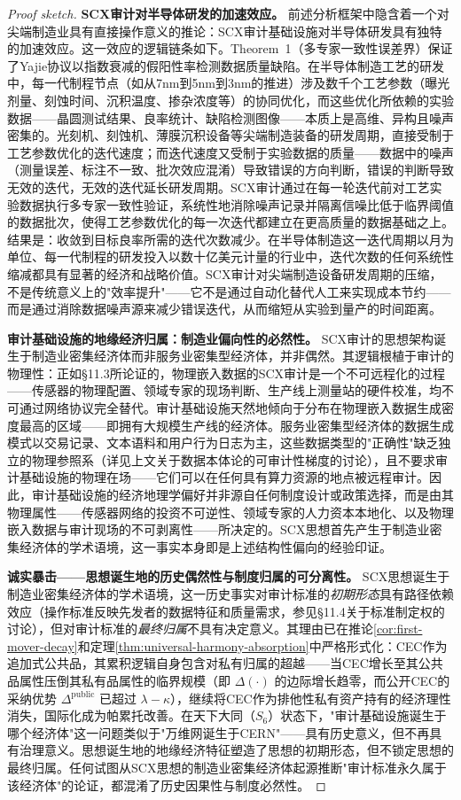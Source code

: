 \documentclass[12pt,a4paper]{ctexart}
\theoremstyle{definition}
\theoremstyle{remark}
\begin{document}
\begin{proof}[Proof sketch]
\textbf{SCX审计对半导体研发的加速效应。} 前述分析框架中隐含着一个对尖端制造业具有直接操作意义的推论：SCX审计基础设施对半导体研发具有独特的加速效应。这一效应的逻辑链条如下。Theorem~1（多专家一致性误差界）保证了Yajie协议以指数衰减的假阳性率检测数据质量缺陷。在半导体制造工艺的研发中，每一代制程节点（如从7nm到5nm到3nm的推进）涉及数千个工艺参数（曝光剂量、刻蚀时间、沉积温度、掺杂浓度等）的协同优化，而这些优化所依赖的实验数据——晶圆测试结果、良率统计、缺陷检测图像——本质上是高维、异构且噪声密集的。光刻机、刻蚀机、薄膜沉积设备等尖端制造装备的研发周期，直接受制于工艺参数优化的迭代速度；而迭代速度又受制于实验数据的质量——数据中的噪声（测量误差、标注不一致、批次效应混淆）导致错误的方向判断，错误的判断导致无效的迭代，无效的迭代延长研发周期。SCX审计通过在每一轮迭代前对工艺实验数据执行多专家一致性验证，系统性地消除噪声记录并隔离信噪比低于临界阈值的数据批次，使得工艺参数优化的每一次迭代都建立在更高质量的数据基础之上。结果是：收敛到目标良率所需的迭代次数减少。在半导体制造这一迭代周期以月为单位、每一代制程的研发投入以数十亿美元计量的行业中，迭代次数的任何系统性缩减都具有显著的经济和战略价值。SCX审计对尖端制造设备研发周期的压缩，不是传统意义上的"效率提升"——它不是通过自动化替代人工来实现成本节约——而是通过消除数据噪声源来减少错误迭代，从而缩短从实验到量产的时间距离。

\textbf{审计基础设施的地缘经济归属：制造业偏向性的必然性。} SCX审计的思想架构诞生于制造业密集经济体而非服务业密集型经济体，并非偶然。其逻辑根植于审计的物理性：正如§11.3所论证的，物理嵌入数据的SCX审计是一个不可远程化的过程——传感器的物理配置、领域专家的现场判断、生产线上测量站的硬件校准，均不可通过网络协议完全替代。审计基础设施天然地倾向于分布在物理嵌入数据生成密度最高的区域——即拥有大规模生产线的经济体。服务业密集型经济体的数据生成模式以交易记录、文本语料和用户行为日志为主，这些数据类型的"正确性"缺乏独立的物理参照系（详见上文关于数据本体论的可审计性梯度的讨论），且不要求审计基础设施的物理在场——它们可以在任何具有算力资源的地点被远程审计。因此，审计基础设施的经济地理学偏好并非源自任何制度设计或政策选择，而是由其物理属性——传感器网络的投资不可逆性、领域专家的人力资本本地化、以及物理嵌入数据与审计现场的不可剥离性——所决定的。SCX思想首先产生于制造业密集经济体的学术语境，这一事实本身即是上述结构性偏向的经验印证。

\textbf{诚实暴击——思想诞生地的历史偶然性与制度归属的可分离性。} SCX思想诞生于制造业密集经济体的学术语境，这一历史事实对审计标准的\textit{初期形态}具有路径依赖效应（操作标准反映先发者的数据特征和质量需求，参见§11.4关于标准制定权的讨论），但对审计标准的\textit{最终归属}不具有决定意义。其理由已在推论\ref{cor:first-mover-decay}和定理\ref{thm:universal-harmony-absorption}中严格形式化：CEC作为追加式公共品，其累积逻辑自身包含对私有归属的超越——当CEC增长至其公共品属性压倒其私有品属性的临界规模（即 $\Delta(\cdot)$ 的边际增长趋零，而公开CEC的采纳优势 $\Delta^{\text{public}}$ 已超过 $\lambda - \kappa$），继续将CEC作为排他性私有资产持有的经济理性消失，国际化成为帕累托改善。在天下大同（$S_6$）状态下，"审计基础设施诞生于哪个经济体"这一问题类似于"万维网诞生于CERN"——具有历史意义，但不再具有治理意义。思想诞生地的地缘经济特征塑造了思想的初期形态，但不锁定思想的最终归属。任何试图从SCX思想的制造业密集经济体起源推断"审计标准永久属于该经济体"的论证，都混淆了历史因果性与制度必然性。


\end{proof}
\end{document}

